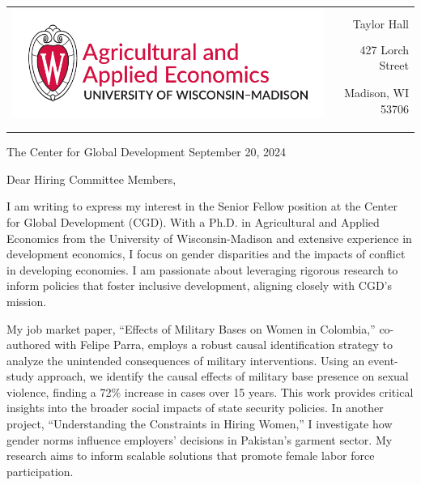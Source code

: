 \documentclass[12pt]{letter}
\begin{document}
\begin{tabularx}{\textwidth}{Xr}
\multirow{4}{*}{\includegraphics[height=3\baselineskip]{logo_cropped.pdf}} &  \\
& Taylor Hall \\
& 427 Lorch Street \\
& Madison, WI 53706 \\
[-1.8ex]\\
\\
\end{tabularx}

The Center for Global Development \hfill September 20, 2024 \\

\medskip

Dear Hiring Committee Members,

I am writing to express my interest in the Senior Fellow position at the Center for Global Development (CGD). 
With a Ph.D. in Agricultural and Applied Economics from the University of Wisconsin-Madison and extensive experience 
in development economics, I focus on gender disparities and the impacts of conflict in developing economies. 
I am passionate about leveraging rigorous research to inform policies that foster inclusive development, 
aligning closely with CGD's mission.

My job market paper, “Effects of Military Bases on Women in Colombia,” co-authored with Felipe Parra, employs 
a robust causal identification strategy to analyze the unintended consequences of military interventions. 
Using an event-study approach, we identify the causal effects of military base presence on sexual violence, finding 
a 72\% increase in cases over 15 years. This work provides critical insights into the broader social impacts of 
state security policies. In another project, “Understanding the Constraints in Hiring Women,” I investigate how gender 
norms influence employers' decisions in Pakistan's garment sector. My research aims to inform scalable solutions that 
promote female labor force participation.
\end{document}
